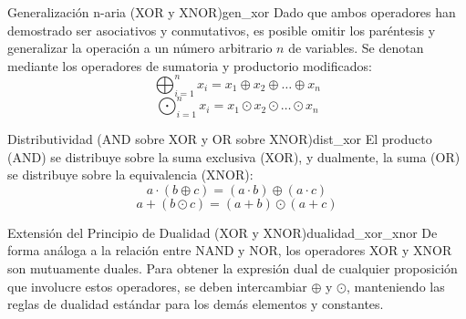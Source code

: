 \begin{teorema}{Generalización n-aria (XOR y XNOR)}{gen_xor}
Dado que ambos operadores han demostrado ser asociativos y conmutativos, es posible omitir los paréntesis y generalizar la operación a un número arbitrario $n$ de variables. Se denotan mediante los operadores de sumatoria y productorio modificados:
\[ \bigoplus_{i=1}^{n} x_i = x_1 \oplus x_2 \oplus \dots \oplus x_n \]
\[ \bigodot_{i=1}^{n} x_i = x_1 \odot x_2 \odot \dots \odot x_n \]
\end{teorema}

\begin{teorema}{Distributividad (AND sobre XOR y OR sobre XNOR)}{dist_xor}
El producto (AND) se distribuye sobre la suma exclusiva (XOR), y dualmente, la suma (OR) se distribuye sobre la equivalencia (XNOR):
\[ a \cdot (b \oplus c) = (a \cdot b) \oplus (a \cdot c) \]
\[ a + (b \odot c) = (a + b) \odot (a + c) \]
\end{teorema}

\begin{teorema}{Extensión del Principio de Dualidad (XOR y XNOR)}{dualidad_xor_xnor}
De forma análoga a la relación entre NAND y NOR, los operadores XOR y XNOR son mutuamente duales. Para obtener la expresión dual de cualquier proposición que involucre estos operadores, se deben intercambiar $\oplus$ y $\odot$, manteniendo las reglas de dualidad estándar para los demás elementos y constantes.
\end{teorema}

